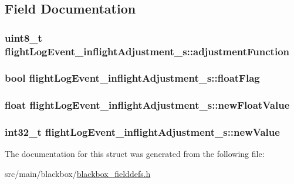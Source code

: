 \subsection{Field Documentation}
\hypertarget{structflightLogEvent__inflightAdjustment__s_a0d0a74ba8f9f3f6b54ff2faaa9933095}{
\subsubsection[{adjustment\+Function}]{\setlength{\rightskip}{0pt plus 5cm}uint8\+\_\+t flight\+Log\+Event\+\_\+inflight\+Adjustment\+\_\+s\+::adjustment\+Function}}\label{structflightLogEvent__inflightAdjustment__s_a0d0a74ba8f9f3f6b54ff2faaa9933095}
\hypertarget{structflightLogEvent__inflightAdjustment__s_a4ab23b4482356c6a7946652449a28056}{
\subsubsection[{float\+Flag}]{\setlength{\rightskip}{0pt plus 5cm}bool flight\+Log\+Event\+\_\+inflight\+Adjustment\+\_\+s\+::float\+Flag}}\label{structflightLogEvent__inflightAdjustment__s_a4ab23b4482356c6a7946652449a28056}
\hypertarget{structflightLogEvent__inflightAdjustment__s_a397ef9e6f767195fb6098282edd39208}{
\subsubsection[{new\+Float\+Value}]{\setlength{\rightskip}{0pt plus 5cm}float flight\+Log\+Event\+\_\+inflight\+Adjustment\+\_\+s\+::new\+Float\+Value}}\label{structflightLogEvent__inflightAdjustment__s_a397ef9e6f767195fb6098282edd39208}
\hypertarget{structflightLogEvent__inflightAdjustment__s_ad163fddf36f8efec9f24df44ff5e6729}{
\subsubsection[{new\+Value}]{\setlength{\rightskip}{0pt plus 5cm}int32\+\_\+t flight\+Log\+Event\+\_\+inflight\+Adjustment\+\_\+s\+::new\+Value}}\label{structflightLogEvent__inflightAdjustment__s_ad163fddf36f8efec9f24df44ff5e6729}


The documentation for this struct was generated from the following file\+:\begin{DoxyCompactItemize}
\item 
src/main/blackbox/\hyperlink{blackbox__fielddefs_8h}{blackbox\+\_\+fielddefs.\+h}\end{DoxyCompactItemize}
